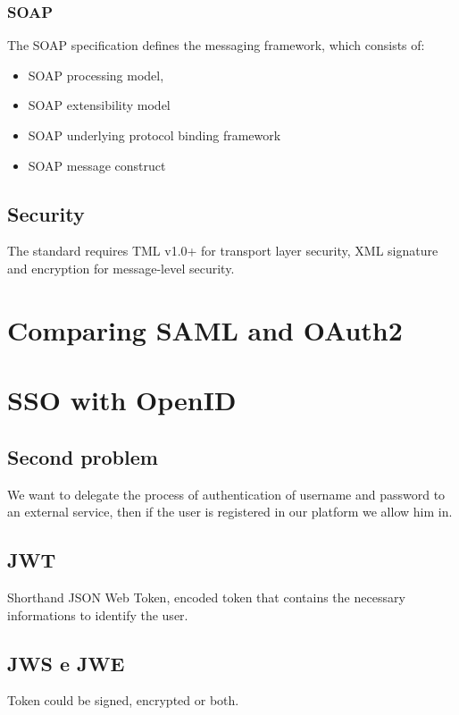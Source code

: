 \documentclass{style}
\begin{document}
\subsubsection{SOAP}
The SOAP specification defines the messaging framework, which consists of:
\begin{itemize}
    \item SOAP processing model,
    \item SOAP extensibility model
    \item SOAP underlying protocol binding framework
    \item SOAP message construct
\end{itemize}

\subsection{Security}
The standard requires TML v1.0+ for transport layer security, XML signature
and encryption for message-level security.


\section{Comparing SAML and OAuth2}




\section{SSO with OpenID}
\subsection{Second problem}
We want to delegate the process of authentication of username and password
to an external service, then if the user is registered in our platform we
allow him in.

\subsection{JWT}
Shorthand JSON Web Token, encoded token that contains the necessary
informations to identify the user.

\subsection{JWS e JWE}
Token could be signed, encrypted or both.
\end{document}
